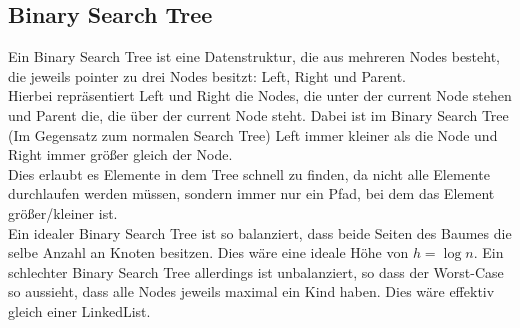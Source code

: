 \documentclass[
../../AuD-Zusammenfassung.tex,
]
{subfiles}
\begin{document}
\subsection{Binary Search Tree}
Ein Binary Search Tree ist eine Datenstruktur, die aus mehreren Nodes besteht, die jeweils pointer zu drei Nodes besitzt: Left, Right und Parent. \\
Hierbei repräsentiert Left und Right die Nodes, die unter der current Node stehen und Parent die, die über der current Node steht. Dabei ist im Binary Search Tree (Im Gegensatz zum normalen Search Tree) Left immer kleiner als die Node und Right immer größer gleich der Node. \\
Dies erlaubt es Elemente in dem Tree schnell zu finden, da nicht alle Elemente durchlaufen werden müssen, sondern immer nur ein Pfad, bei dem das Element größer/kleiner ist. \\
Ein idealer Binary Search Tree ist so balanziert, dass beide Seiten des Baumes die selbe Anzahl an Knoten besitzen. Dies wäre eine ideale Höhe von $h = \log n$.
Ein schlechter Binary Search Tree allerdings ist unbalanziert, so dass der Worst-Case so aussieht, dass alle Nodes jeweils maximal ein Kind haben. Dies wäre effektiv gleich einer LinkedList.

\begin{minipage}[t]{0.5\textwidth}
    \centering
\end{minipage}
\end{document}
